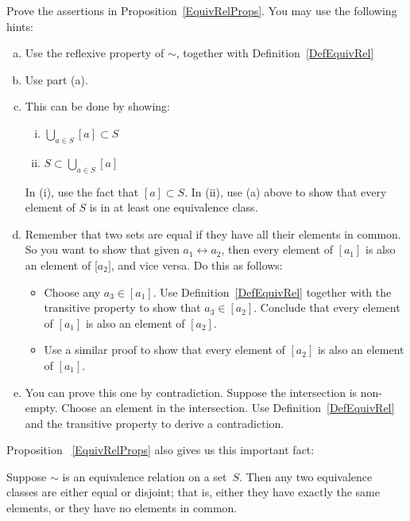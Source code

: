 \begin{exercise}\label{exercise:EquivalenceRelationsChap:EquivRelPropsPfEx}
Prove the assertions in Proposition~\ref{EquivRelProps}. You may use the following hints:
\begin{enumerate}[(a)]
\item
Use the reflexive property of $\sim$, together with Definition~\ref{DefEquivRel}
\item
Use part (a).
\item
This can be done by showing:
\begin{enumerate}[(i)]
\item 
$\bigcup_{a \in S} [a] \subset S$
\item
$S \subset \bigcup_{a \in S} [a]$
\end{enumerate}
In (i), use the fact that $[a] \subset S$.  In (ii), use (a) above to show that every element of $S$ is in at least one equivalence class.
\item
Remember that two sets are equal if they have all their elements in common. So you want to show that given $a_1 \rel a_2$, then every element of $[a_1]$ is also an element of [$a_2]$, and vice versa. Do this as follows: 
\begin{itemize}
\item
Choose any $a_3 \in [a_1]$. Use Definition~\ref{DefEquivRel} together with the transitive property to show that $a_3 \in [a_2]$. Conclude that every element of $[a_1]$ is also an element of $[a_2]$. 
\item
Use a similar proof to show that every element of $[a_2]$ is also an element of $[a_1]$.
\end{itemize}
\item
You can prove this one by contradiction. Suppose the intersection is non-empty. Choose an element in the intersection. Use Definition~\ref{DefEquivRel} and the transitive property to derive a contradiction.
\end{enumerate}
\end{exercise}

Proposition~ \ref{EquivRelProps} also gives us this important fact:

\begin{prop}\label{proposition:EquivalenceRelationsChap:DisjointEquiv}
Suppose $\sim$ is an equivalence relation on a set~$S$. Then any two equivalence classes are either equal or disjoint; that is, either they have exactly the same elements, or they have no elements in common. 
\end{prop}

